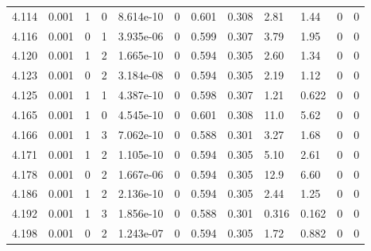 \documentclass[preview]{standalone}
\begin{document}
{{{{{{{{{\begin{tabular}{L{1.2cm}C{1.2cm} C{0.3cm}C{0.5cm} C{1.4cm}C{1.4cm} C{1.4cm}C{1.4cm} C{1.6cm}C{1.6cm} C{1.6cm}C{1.6cm}}
  4.114  &  0.001  & 1     &  0 &  8.614e-10  & 0  &  0.601&   0.308& 2.81 & 1.44   &  0 & 0  \\ 
  4.116  &  0.001  & 0     &  1 &  3.935e-06  & 0  &  0.599&   0.307& 3.79 & 1.95   &  0 & 0  \\ 
  4.120  &  0.001  & 1     &  2 &  1.665e-10  & 0  &  0.594&   0.305& 2.60 & 1.34   &  0 & 0  \\ 
  4.123  &  0.001  & 0     &  2 &  3.184e-08  & 0  &  0.594&   0.305& 2.19 & 1.12   &  0 & 0  \\ 
  4.125  &  0.001  & 1     &  1 &  4.387e-10  & 0  &  0.598&   0.307& 1.21 & 0.622   &  0 & 0  \\ 
  4.165  &  0.001  & 1     &  0 &  4.545e-10  & 0  &  0.601&   0.308& 11.0 & 5.62   &  0 & 0  \\ 
  4.166  &  0.001  & 1     &  3 &  7.062e-10  & 0  &  0.588&   0.301& 3.27 & 1.68   &  0 & 0  \\ 
  4.171  &  0.001  & 1     &  2 &  1.105e-10  & 0  &  0.594&   0.305& 5.10 & 2.61   &  0 & 0  \\ 
  4.178  &  0.001  & 0     &  2 &  1.667e-06  & 0  &  0.594&   0.305& 12.9 & 6.60   &  0 & 0  \\ 
  4.186  &  0.001  & 1     &  2 &  2.136e-10  & 0  &  0.594&   0.305& 2.44 & 1.25   &  0 & 0  \\ 
  4.192  &  0.001  & 1     &  3 &  1.856e-10  & 0  &  0.588&   0.301& 0.316 & 0.162   &  0 & 0  \\ 
  4.198  &  0.001  & 0     &  2 &  1.243e-07  & 0  &  0.594&   0.305& 1.72 & 0.882   &  0 & 0  \\ 
\hline 
\end{tabular} 

}}}}}}}}}
\end{document}
